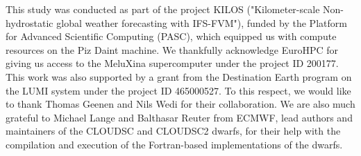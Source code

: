 \documentclass[../main.tex]{subfiles}
\begin{document}



	\begin{acknowledgements}
	    This study was conducted as part of the project KILOS ("Kilometer-scale Non-hydrostatic global weather forecasting with IFS-FVM"), funded by the Platform for Advanced Scientific Computing (PASC), which equipped us with compute resources on the Piz Daint machine. We thankfully acknowledge EuroHPC for giving us access to the MeluXina supercomputer under the project ID 200177. This work was also supported by a grant from the Destination Earth program on the LUMI system under the project ID 465000527. To this respect, we would like to thank Thomas Geenen and Nils Wedi for their collaboration. We are also much grateful to Michael Lange and Balthasar Reuter from ECMWF, lead authors and maintainers of the CLOUDSC and CLOUDSC2 dwarfs, for their help with the compilation and execution of the Fortran-based implementations of the dwarfs.
	\end{acknowledgements}
\end{document}
